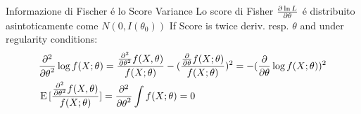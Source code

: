 \documentclass[asd-beamer.tex]{subfiles}%
\begin{document}
\begin{frame}{Informazione di Fischer \'e lo Score Variance}\frameintoc
    Lo score di Fisher $\frac{\partial \ln{L}}{\partial \theta}$ \'e distribuito asintoticamente come $N(0,I(\theta_0))$
If Score is twice deriv. resp. $\theta$ and under regularity conditions:
\begin{align*}
&\frac{\partial^2}{{\partial \theta}^2}\log{f(X;\theta)}=\frac{\frac{\partial^2}{{\partial \theta}^2}f(X,\theta)}{f(X;\theta)}-(\frac{\frac{\partial}{\partial \theta}f(X;\theta)}{f(X;\theta)})^2=-(\frac{\partial}{\partial \theta}\log{f(X;\theta)})^2\\
&\operatorname{E}{[\frac{\frac{\partial^2}{{\partial \theta}^2}f(X,\theta)}{f(X;\theta)}]}=\frac{\partial^2}{{\partial \theta}^2}\int f(X;\theta)=0
\end{align*}
\end{frame}
\end{document}

